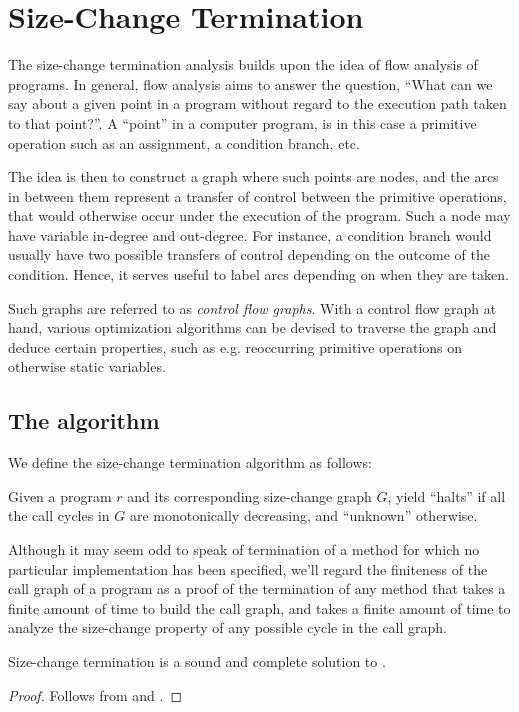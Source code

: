 \chapter{Size-Change Termination}\label{section:size-change-termination}

The size-change termination analysis builds upon the idea of flow analysis of
programs. In general, flow analysis aims to answer the question, ``What can we
say about a given point in a program without regard to the execution path taken
to that point?''. A ``point'' in a computer program, is in this case a primitive
operation such as an assignment, a condition branch, etc.

The idea is then to construct a graph where such points are nodes, and the arcs
in between them represent a transfer of control between the primitive
operations, that would otherwise occur under the execution of the program.
Such a node may have variable in-degree and out-degree. For instance, a
condition branch would usually have two possible transfers of control depending
on the outcome of the condition. Hence, it serves useful to label arcs
depending on when they are taken.

Such graphs are referred to as \emph{control flow graphs}. With a control flow
graph at hand, various optimization algorithms can be devised to traverse the
graph and deduce certain properties, such as e.g.  reoccurring primitive
operations on otherwise static variables\cite{kildall}.





\section{The algorithm}

We define the size-change termination algorithm as follows:

\begin{definition}\label{definition:size-change-algorithm} Given a program $r$
and its corresponding size-change graph $G$, yield ``halts'' if all the call
cycles in $G$ are monotonically decreasing, and ``unknown''
otherwise.\end{definition}

Although it may seem odd to speak of termination of a method for which no
particular implementation has been specified, we'll regard the finiteness of
the call graph of a program as a proof of the termination of any method that
takes a finite amount of time to build the call graph, and takes a finite
amount of time to analyze the size-change property of any possible cycle in the
call graph.

\begin{theorem} Size-change termination is a sound and complete solution to
.\end{theorem}

\begin{proof} Follows from  and
.\end{proof} 
